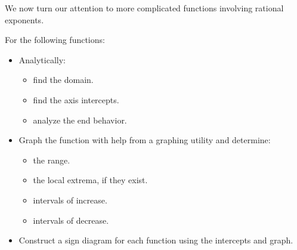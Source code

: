 \documentclass{ximera}
\begin{document}
We now turn our attention to more complicated functions involving rational exponents.


\begin{example}  For the following functions:

\begin{itemize}

\item Analytically:

\begin{multicols}{3}

\begin{itemize}

\item find the domain.

\item find the axis intercepts.

\item analyze the end behavior.

\end{itemize}

\end{multicols}


\item Graph the function with help from a graphing utility and determine:

\begin{multicols}{2}

\begin{itemize}

\item  the range.

\item the local extrema, if they exist.

\end{itemize}

\end{multicols}

\begin{multicols}{2}

\begin{itemize}

\item intervals of increase.

\item intervals of decrease.

\end{itemize}

\end{multicols}

\item Construct a sign diagram for each function using the intercepts and graph.
\end{itemize}


\end{example}
\end{document}
